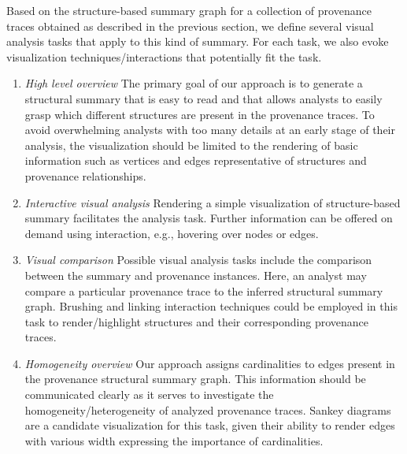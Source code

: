 Based on the structure-based summary graph for a collection of provenance traces obtained as described in the previous section, we define several visual analysis tasks that apply to this kind of summary. For each task, we also evoke visualization techniques/interactions that potentially fit the task. 


\begin{enumerate}
\item \emph{High level overview }
The primary goal of our approach is to generate a structural summary that is  easy to read and that allows analysts to easily grasp which different structures are present in the provenance traces. To avoid overwhelming analysts with too many details at an early stage of their analysis, the visualization should be limited to the rendering of basic information such as vertices and edges representative of structures and provenance relationships. \label{itm:t1}   


\item \emph{Interactive visual analysis }  Rendering a simple visualization of structure-based summary facilitates the analysis task. 
Further information can be offered on demand using interaction, e.g., hovering over nodes or edges. \label{itm:t2} 



\item \emph{Visual comparison } Possible visual analysis tasks include the comparison between the summary and provenance instances.
Here, an analyst may compare a particular provenance trace to the inferred structural summary graph. Brushing and linking interaction techniques could be employed in this task to render/highlight structures and their corresponding provenance traces. \label{itm:t3} 

\item \emph{Homogeneity overview } Our approach assigns cardinalities to edges present in the provenance structural summary graph.
This information should be communicated clearly as it serves to investigate the homogeneity/heterogeneity of analyzed provenance traces. Sankey diagrams~\cite{Riehmann:2015} are a candidate visualization for this task, given their ability to render edges with various width expressing the importance of cardinalities.



\end{enumerate}
